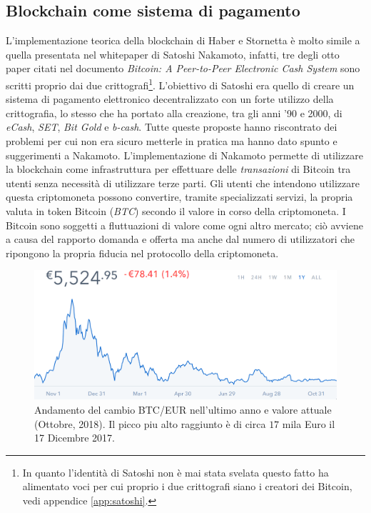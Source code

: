 \subsection{Blockchain come sistema di pagamento}
L'implementazione teorica della blockchain di Haber e Stornetta è molto simile a quella presentata nel whitepaper di Satoshi Nakamoto\cite{bitcoin}, infatti, tre degli otto paper citati nel documento \textit{Bitcoin: A Peer-to-Peer Electronic Cash System} sono scritti proprio dai due crittografi\footnote{In quanto l'identità di Satoshi non è mai stata svelata questo fatto ha alimentato voci per cui proprio i due crittografi siano i creatori dei Bitcoin, vedi appendice \ref{app:satoshi}.}.\newline
L'obiettivo di Satoshi era quello di creare un sistema di pagamento elettronico decentralizzato con un forte utilizzo della crittografia, lo stesso che ha portato alla creazione, tra gli anni '90 e 2000, di \textit{eCash}, \textit{SET}, \textit{Bit Gold} e \textit{b-cash}. Tutte queste proposte hanno riscontrato dei problemi per cui non era sicuro metterle in pratica ma hanno dato spunto e suggerimenti a Nakamoto.
L'implementazione di Nakamoto permette di utilizzare la blockchain come infrastruttura per effettuare delle \textit{transazioni} di Bitcoin tra utenti senza necessità di utilizzare terze parti. Gli utenti che intendono utilizzare questa criptomoneta possono convertire, tramite specializzati servizi, la propria valuta in token Bitcoin (\textit{BTC}) secondo il valore in corso della criptomoneta.\newline
I Bitcoin sono soggetti a fluttuazioni di valore come ogni altro mercato; ciò avviene a causa del rapporto domanda e offerta ma anche dal numero di utilizzatori che ripongono la propria fiducia nel protocollo della criptomoneta.
\begin{figure}
    \centering
    \includegraphics[width=\textwidth]{images/bitcoinchart.png}
    \caption{Andamento del cambio BTC/EUR nell'ultimo anno e valore attuale (Ottobre, 2018). Il picco piu alto raggiunto è di circa $17$ mila Euro il 17 Dicembre 2017.}
\end{figure}

